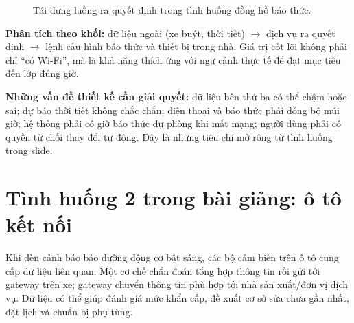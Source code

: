 \begin{figure}[H]\centering
{}\caption{Tái dựng luồng ra quyết định trong tình huống đồng hồ báo thức.}
\end{figure}

\textbf{Phân tích theo khối:} dữ liệu ngoài (xe buýt, thời tiết) $\rightarrow$ dịch vụ ra quyết định $\rightarrow$ lệnh cấu hình báo thức và thiết bị trong nhà. Giá trị cốt lõi không phải chỉ ``có Wi-Fi'', mà là khả năng thích ứng với ngữ cảnh thực tế để đạt mục tiêu đến lớp đúng giờ.

\begin{expandbox}
\textbf{Những vấn đề thiết kế cần giải quyết:} dữ liệu bên thứ ba có thể chậm hoặc sai; dự báo thời tiết không chắc chắn; điện thoại và báo thức phải đồng bộ múi giờ; hệ thống phải có giờ báo thức dự phòng khi mất mạng; người dùng phải có quyền từ chối thay đổi tự động. Đây là những tiêu chí mở rộng từ tình huống trong slide.
\end{expandbox}

\section{Tình huống 2 trong bài giảng: ô tô kết nối}
Khi đèn cảnh báo bảo dưỡng động cơ bật sáng, các bộ cảm biến trên ô tô cung cấp dữ liệu liên quan. Một cơ chế chẩn đoán tổng hợp thông tin rồi gửi tới gateway trên xe; gateway chuyển thông tin phù hợp tới nhà sản xuất/đơn vị dịch vụ. Dữ liệu có thể giúp đánh giá mức khẩn cấp, đề xuất cơ sở sửa chữa gần nhất, đặt lịch và chuẩn bị phụ tùng.

